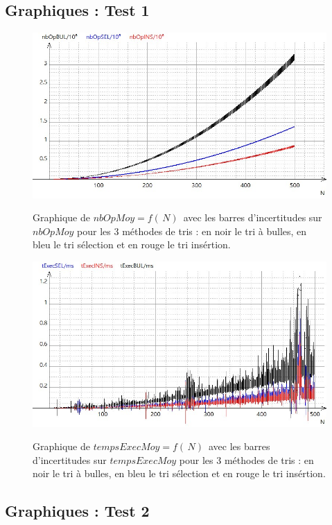 \documentclass{report}
\begin{document}
\subsection{Graphiques : Test 1}

\begin{figure}[H]
	\includegraphics[width=\textwidth]{../graphe/nbOp.jpg}
	\label{nbOP1}
	\caption{Graphique de $nbOpMoy=f(\,N)\,$ avec les barres d'incertitudes sur $nbOpMoy$ pour les 3 méthodes de tris : en noir le tri à bulles, en bleu le tri sélection et en rouge le tri insértion.}
\end{figure}
\begin{figure}[H]
	\includegraphics[width=\textwidth]{../graphe/tExecAvecU.jpg}
	\label{tExec1}
	\caption{Graphique de $tempsExecMoy=f(\,N)\,$ avec les barres d'incertitudes sur $tempsExecMoy$ pour les 3 méthodes de tris : en noir le tri à bulles, en bleu le tri sélection et en rouge le tri insértion.}
\end{figure}

\subsection{Graphiques : Test 2}
\end{document}
